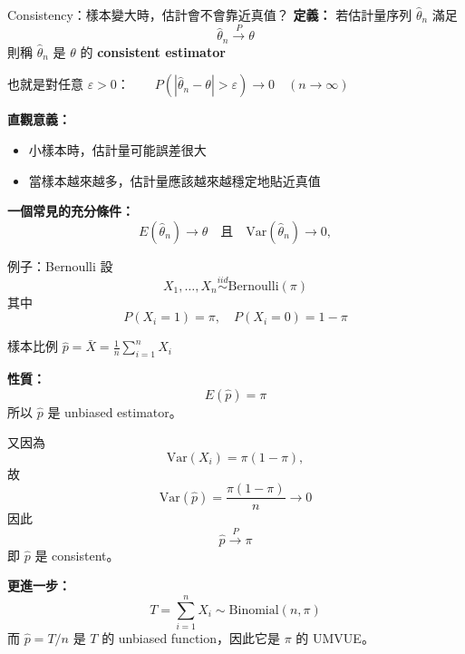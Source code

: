 \documentclass[aspectratio=169,12pt]{beamer}
\begin{document}

\begin{frame}{Consistency：樣本變大時，估計會不會靠近真值？}
    \textbf{定義：}
    若估計量序列 $\hat{\theta}_n$ 滿足 $$\hat{\theta}_n \xrightarrow{P} \theta$$
    則稱 $\hat{\theta}_n$ 是 $\theta$ 的 \textbf{consistent estimator}

    \vspace{0.8em}
    也就是對任意 $\varepsilon>0$：$\qquad P(|\hat{\theta}_n-\theta|>\varepsilon)\to 0\quad (n\to\infty)$

    \vspace{0.8em}
    \textbf{直觀意義：}
    \begin{itemize}
        \item 小樣本時，估計量可能誤差很大
        \item 當樣本越來越多，估計量應該越來越穩定地貼近真值
    \end{itemize}

    \vspace{0.8em}
    \textbf{一個常見的充分條件：}
    \vspace{-1.25em}
    $$E(\hat{\theta}_n)\to \theta\quad\text{且}\quad\mathrm{Var}(\hat{\theta}_n)\to 0,$$
\end{frame}

\begin{frame}{例子：Bernoulli}
設 $$X_1, \dots,X_n \overset{iid}{\sim}\mathrm{Bernoulli}(\pi)$$
其中 $$P(X_i=1)=\pi, \quad P(X_i=0)=1-\pi$$

樣本比例 $\hat p=\bar X=\frac1n\sum_{i=1}^n X_i$

\vspace{0.5em}
\textbf{性質：}
$$
E(\hat p)=\pi
$$
所以 $\hat p$ 是 unbiased estimator。

又因為
$$
\mathrm{Var}(X_i)=\pi(1-\pi),
$$
故
$$
\mathrm{Var}(\hat p)=\frac{\pi(1-\pi)}{n}\to 0
$$
因此
$$
\hat p \xrightarrow{P} \pi
$$
即 $\hat p$ 是 consistent。

\vspace{0.8em}
\textbf{更進一步：}
$$
T=\sum_{i=1}^n X_i \sim \mathrm{Binomial}(n, \pi)
$$
而 $\hat p=T/n$ 是 $T$ 的 unbiased function，因此它是 $\pi$ 的 UMVUE。
\end{frame}
\end{document}
